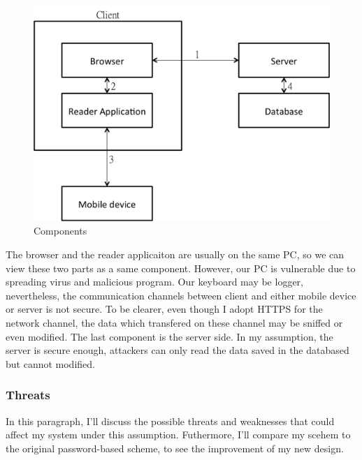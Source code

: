 \begin{CJK}{Bg5}{bsmi}
\begin{figure}
\centering
\includegraphics[scale=0.6]{picture/compose-element.png}
\caption{Components}
\label{fig:compose-element}
\end{figure}

The browser and the reader applicaiton are usually on the same PC, so we can view these two parts as a same component. However, our PC is vulnerable due to spreading virus and malicious program. Our keyboard may be logger, nevertheless, the communication channels between client and either mobile device or server is not secure. To be clearer, even though I adopt HTTPS for the network channel, the data which transfered on these channel may be sniffed or even modified. The last component is the server side. In my assumption, the server is secure enough, attackers can only read the data saved in the databased but cannot modified.

\subsubsection{Threats}

In this paragraph, I'll discuss the possible threats and weaknesses that could affect my system under this assumption. Futhermore, I'll compare my scehem to the original password-based scheme, to see the improvement of my new design.


\end{CJK}
